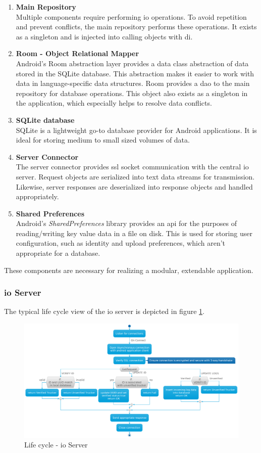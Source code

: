 \begin{enumerate}
\item \textbf{Main Repository}\\
Multiple components require performing \ac{io} operations.
To avoid repetition and prevent conflicts, the main repository performs these operations.
It exists as a singleton and is injected into calling objects with \ac{di}.
\item \textbf{Room - Object Relational Mapper}\\
Android's Room abstraction layer provides a data class abstraction of data stored in the SQLite database.
This abstraction makes it easier to work with data in language-specific data structures.
Room provides a \ac{dao} to the main repository for database operations.
This object also exists as a singleton in the application, which especially helps to resolve data conflicts.
\item \textbf{SQLite database}\\
SQLite is a lightweight go-to database provider for Android applications.
It is ideal for storing medium to small sized volumes of data.
\item \textbf{Server Connector}\\
The server connector provides \ac{ssl} socket communication with the central \ac{io} server.
Request objects are serialized into text data streams for transmission.
Likewise, server responses are deserialized into response objects and handled appropriately.
\item \textbf{Shared Preferences}\\
Android's \textit{SharedPreferences} library provides an \ac{api} for the purposes of reading/writing key value data in a file on disk.
This is used for storing user configuration, such as identity and upload preferences, which aren't appropriate for a database.
\end{enumerate}

These components are necessary for realizing a modular, extendable application.

\subsubsection{\Ac{io} Server}
The typical life cycle view of the \ac{io} server is depicted in figure \ref{fig:IO_activity}.

\begin{figure}[H]
\centering
\includegraphics[width=6in]{../diag/IO_activity.png}
\caption{Life cycle - \Ac{io} Server}
\label{fig:IO_activity}
\end{figure}

